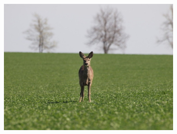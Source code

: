 \begin{figure}[H]
	\centering
    \begin{subfigure}{\textwidth}
   	  \centering
      \includegraphics[scale=1.0]{obrazky/ORIG23.jpg}
      \caption{}
    \end{subfigure}
    \vspace{2pt}
    

\end{figure}
